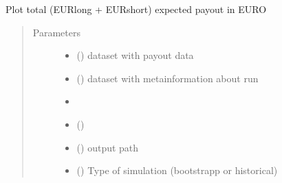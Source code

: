 \documentclass[a4paper,11pt,english]{sphinxmanual}
\begin{document}

\begin{fulllineitems}
\label{\detokenize{simulation_analysis:src.simulation_analysis.task_swap_payout_analysis.plot_expected_payout_EUR}}
\sphinxAtStartPar
Plot total (EURlong + EURshort) expected payout in EURO
\begin{quote}\begin{description}
\item[{Parameters}] \leavevmode\begin{itemize}
\item {} 
\sphinxAtStartPar
{} () \textendash{} dataset with payout data

\item {} 
\sphinxAtStartPar
{} () \textendash{} dataset with metainformation about run

\item {} 
\sphinxAtStartPar
\sphinxstyleliteralstrong{\sphinxupquote{(}} \textendash{} 

\item {} 
\sphinxAtStartPar
{}\sphinxstyleliteralstrong{\sphinxupquote{)}} () \textendash{} 

\item {} 
\sphinxAtStartPar
{} () \textendash{} output path

\item {} 
\sphinxAtStartPar
{} () \textendash{} Type of simulation (bootstrapp or historical)

\end{itemize}

\end{description}\end{quote}

\end{fulllineitems}
\end{document}

